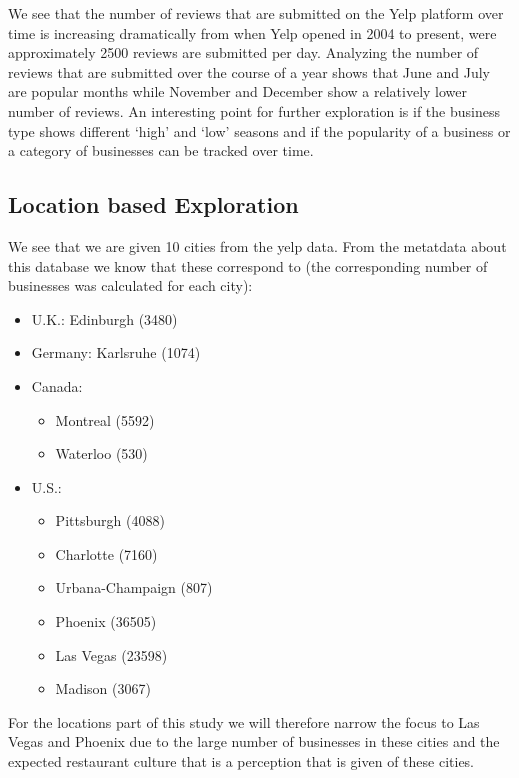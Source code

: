\documentclass[11pt]{article}
\begin{document}
We see that the number of reviews that are submitted on the Yelp platform over time is increasing dramatically from when Yelp opened in 2004 to present, were approximately 2500 reviews are submitted per day. Analyzing the number of reviews that are submitted over the course of a year shows that June and July are popular months while November and December show a relatively lower number of reviews. An interesting point for further exploration is if the business type shows different `high' and `low' seasons and if the popularity of a business or a category of businesses can be tracked over time.

\subsection*{Location based Exploration}

We see that we are given 10 cities from the yelp data. From the metatdata about this database we know that these correspond to (the corresponding number of businesses was calculated for each city):
\begin{itemize}
	\item U.K.: Edinburgh (3480)
	\item Germany: Karlsruhe (1074)
	\item Canada:
		\begin{itemize}
			\item Montreal (5592)
			\item Waterloo (530)
		\end{itemize}
	\item U.S.:
		\begin{itemize}
			\item Pittsburgh (4088)
			\item Charlotte (7160)
			\item Urbana-Champaign (807)
			\item Phoenix (36505)
			\item Las Vegas (23598)
			\item Madison (3067)
		\end{itemize}
\end{itemize}

For the locations part of this study we will therefore narrow the focus to Las Vegas and Phoenix due to the large number of businesses in these cities and the expected restaurant culture that is a perception that is given of these cities.\\
\end{document}
